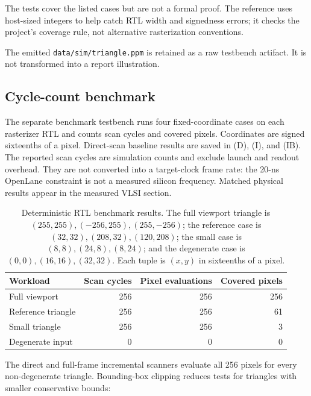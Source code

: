 \documentclass[10pt,a4paper]{article}
\begin{document}
The tests cover the listed cases but are not a formal proof. The reference
uses host-sized integers to help catch RTL width and signedness errors; it
checks the project's coverage rule, not alternative rasterization
conventions.

The emitted \texttt{data/sim/triangle.ppm} is retained as a raw testbench
artifact. It is not transformed into a report illustration.

\subsection{Cycle-count benchmark}

The separate benchmark testbench runs four fixed-coordinate cases on each
rasterizer RTL and counts scan cycles and covered pixels. Coordinates are
signed sixteenths of a pixel. Direct-scan baseline results are saved in
 (D),
 (I), and
 (IB). The reported scan
cycles are simulation counts and exclude launch and readout overhead.
They are not converted into a target-clock frame rate: the 20-ns OpenLane
constraint is not a measured silicon frequency. Matched physical results
appear in the measured VLSI section.

\begin{table}[!htbp]
\centering
\small
\begin{tabular}{lrrr}
\toprule
Workload & Scan cycles & Pixel evaluations & Covered pixels\\
\midrule
Full viewport & 256 & 256 & 256\\
Reference triangle & 256 & 256 & 61\\
Small triangle & 256 & 256 & 3\\
Degenerate input & 0 & 0 & 0\\
\bottomrule
\end{tabular}
\caption{Deterministic RTL benchmark results. The full viewport triangle is
\((255,255),(-256,255),(255,-256)\); the reference case is
\((32,32),(208,32),(120,208)\); the small case is
\((8,8),(24,8),(8,24)\); and the degenerate case is
\((0,0),(16,16),(32,32)\). Each tuple is \((x,y)\) in sixteenths of a
pixel.}
\label{tab:rtlbenc}
\end{table}

The direct and full-frame incremental scanners evaluate all 256 pixels for
every non-degenerate triangle. Bounding-box clipping reduces tests for
triangles with smaller conservative bounds:
\end{document}
